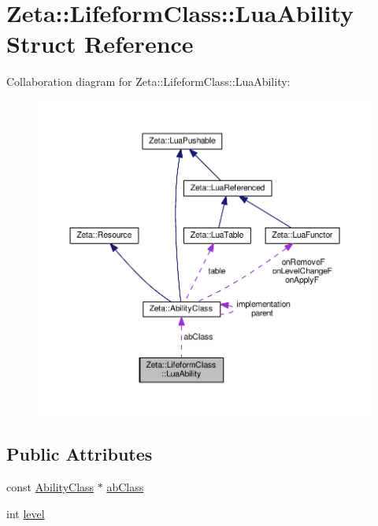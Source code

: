 \hypertarget{structZeta_1_1LifeformClass_1_1LuaAbility}{\section{Zeta\+:\+:Lifeform\+Class\+:\+:Lua\+Ability Struct Reference}
\label{structZeta_1_1LifeformClass_1_1LuaAbility}
}


Collaboration diagram for Zeta\+:\+:Lifeform\+Class\+:\+:Lua\+Ability\+:\nopagebreak
\begin{figure}[H]
\begin{center}
\leavevmode
\includegraphics[width=350pt]{structZeta_1_1LifeformClass_1_1LuaAbility__coll__graph}
\end{center}
\end{figure}
\subsection*{Public Attributes}
\begin{DoxyCompactItemize}
\item 
const \hyperlink{classZeta_1_1AbilityClass}{Ability\+Class} $\ast$ \hyperlink{structZeta_1_1LifeformClass_1_1LuaAbility_a729d1fa401b842ecc7d38c5eeb7eca2c}{ab\+Class}
\item 
int \hyperlink{structZeta_1_1LifeformClass_1_1LuaAbility_a76846d56d9f5298ad5925987c5cd3e6c}{level}
\end{DoxyCompactItemize}


